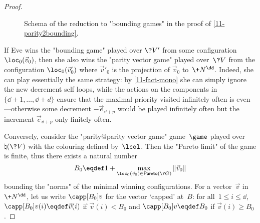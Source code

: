\begin{proof}
\begin{figure}[htbp]
    \caption{\label{11-fig-bounding}Schema of the reduction to
      "bounding games" in the proof of \cref{11-parity2bounding}.}
  \end{figure}
  
  If Eve wins the "bounding game" played over $\?V'$ from some
  configuration $\loc_0(\vec v_0)$, then she also wins the "parity
  vector game" played over~$\?V$ from the configuration $\loc_0(\vec
  v'_0)$ where $\vec v'_0$ is the projection of $\vec v_0$
  to~$\+N^\dd$.  Indeed, she can play essentially the same strategy:
  by \cref{11-fact-mono} she can simply ignore the new decrement
  self loops, while the actions on the components in
  $\{\dd+1,\dots,\dd+d\}$ ensure that the maximal priority visited
  infinitely often is even---otherwise some decrement $-\vec
  e_{\dd+p}$ would be played infinitely often but the increment $\vec
  e_{\dd+p}$ only finitely often.
  

  \medskip
  Conversely, consider the "parity@parity vector game" game~$\game$ played over
  $\natural(\?V)$ with the colouring defined by~$\lcol$.  Then the
  "Pareto limit" of the game is finite, thus there exists a natural
  number
  \begin{equation}\label{11-b0}
    B_0\eqdef 1+\max_{\loc_0(\vec v_0)\in\mathsf{Pareto}(\?G)}\|\vec
  v_0\|
  \end{equation} bounding the "norms" of the minimal winning configurations.
  For a vector~$\vec v$ in~$\+N^\dd$, let us write $\capp[B_0]v$ for
  the vector `capped' at~$B$: for all~$1\leq i\leq\dd$,
  $\capp[B_0]v(i)\eqdef\vec v(i)$ if $\vec v(i)<B_0$ and
  $\capp[B_0]v\eqdef B_0$ if $\vec v(i)\geq B_0$.


\end{proof}
